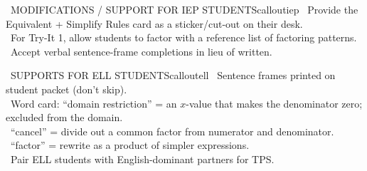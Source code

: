 \documentclass[11pt]{article}
\begin{document}
\begin{callout}{\IconPuzzle\ MODIFICATIONS / SUPPORT FOR IEP STUDENTS}{calloutiep}
\textbullet\ Provide the Equivalent + Simplify Rules card as a sticker/cut-out on their desk.\\
\textbullet\ For Try-It 1, allow students to factor with a reference list of factoring patterns.\\
\textbullet\ Accept verbal sentence-frame completions in lieu of written.
\end{callout}

\begin{callout}{\IconGlobe\ SUPPORTS FOR ELL STUDENTS}{calloutell}
\textbullet\ Sentence frames printed on student packet (don't skip).\\
\textbullet\ Word card: ``domain restriction'' = an \(x\)-value that makes the denominator zero; excluded from the domain.\\
\textbullet\ ``cancel'' = divide out a common factor from numerator and denominator.\\
\textbullet\ ``factor'' = rewrite as a product of simpler expressions.\\
\textbullet\ Pair ELL students with English-dominant partners for TPS.
\end{callout}
\end{document}
